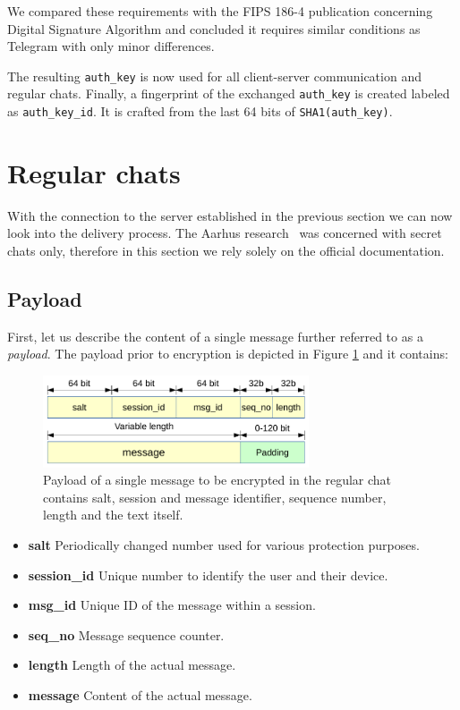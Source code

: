 \documentclass[thesis=M,english]{FITthesis}[2012/10/20]
\begin{document}
We compared these requirements with the FIPS 186-4 publication concerning Digital Signature Algorithm and concluded it requires similar conditions as Telegram with only minor differences.

The resulting \texttt{auth\_key} is now used for all client-server communication and regular chats. Finally, a fingerprint of the exchanged \texttt{auth\_key} is created labeled as \texttt{auth\_key\_id}. It is crafted from the last 64 bits of \texttt{SHA1(auth\_key)}.



\section{Regular chats}\label{crypto-regular}

With the connection to the server established in the previous section we can now look into the delivery process. The Aarhus research~\cite{telegram-aarhus} was concerned with secret chats only, therefore in this section we rely solely on the official documentation.


\subsection{Payload}\label{crypto-regular-payload}

First, let us describe the content of a single message further referred to as a \emph{payload}. The payload prior to encryption is depicted in Figure \ref{img:regular-payload} and it contains:

\begin{figure}[htb]
	\centering
	\includegraphics[width=0.7\textwidth]{regular-payload.pdf}
	\caption[Message payload in regular chats]{Payload of a single message to be encrypted in the regular chat contains salt, session and message identifier, sequence number, length and the text itself.}
	\label{img:regular-payload}
\end{figure}

\begin{itemize}
	\item \textbf{salt} Periodically changed number used for various protection purposes.
	\item \textbf{session\_id} Unique number to identify the user and their device.
	\item \textbf{msg\_id} Unique ID of the message within a session.
	\item \textbf{seq\_no} Message sequence counter.
	\item \textbf{length} Length of the actual message.
	\item \textbf{message} Content of the actual message.
\end{itemize}
\end{document}
